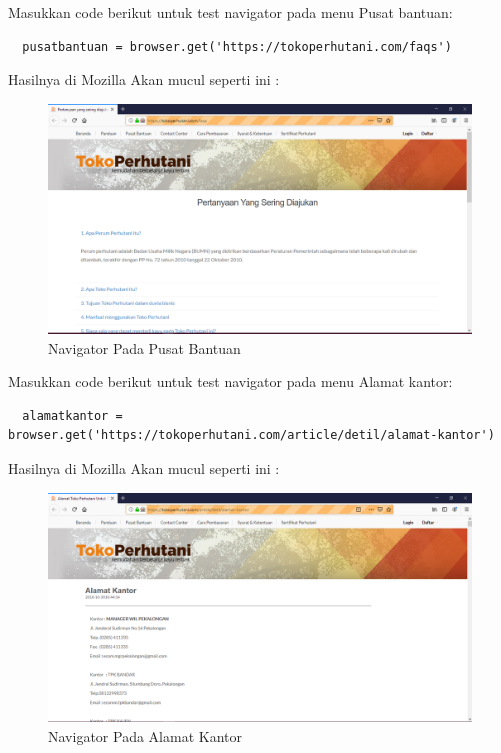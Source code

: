 Masukkan code berikut untuk test navigator pada menu  Pusat bantuan:
\begin{verbatim}
  pusatbantuan = browser.get('https://tokoperhutani.com/faqs')
\end{verbatim}

Hasilnya  di Mozilla Akan mucul seperti ini :
\begin{figure}[h]
\centering
\includegraphics[scale=0.3]{figures/2hasil.PNG}
\caption{Navigator Pada Pusat Bantuan}
\end{figure}

Masukkan code berikut untuk test navigator pada menu  Alamat kantor:
\begin{verbatim}
  alamatkantor = browser.get('https://tokoperhutani.com/article/detil/alamat-kantor')
\end{verbatim}

Hasilnya  di Mozilla Akan mucul seperti ini :
\begin{figure}[h]
\centering
\includegraphics[scale=0.3]{figures/3hasil.PNG}
\caption{Navigator Pada Alamat Kantor}
\end{figure}

